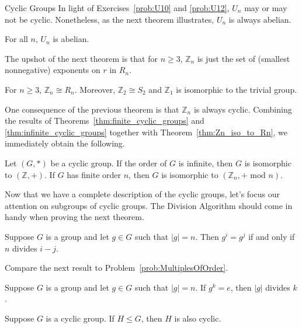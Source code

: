 \begin{section}{Cyclic Groups}
In light of Exercises~\ref{prob:U10} and \ref{prob:U12}, $U_n$ may or may not be cyclic. Nonetheless, as the next theorem illustrates, $U_n$ is always abelian.

\begin{theorem}
For all $n$, $U_n$ is abelian.
\end{theorem}

The upshot of the next theorem is that for $n\geq 3$, $\mathbb{Z}_n$ is just the set of (smallest nonnegative) exponents on $r$ in $R_n$.

\begin{theorem}\label{thm:Zn_iso_to_Rn}
For $n\geq 3$, $\mathbb{Z}_n\cong R_n$. Moreover, $\mathbb{Z}_2\cong S_2$ and $\mathbb{Z}_1$ is isomorphic to the trivial group.
\end{theorem}

One consequence of the previous theorem is that $\mathbb{Z}_n$ is always cyclic. Combining the results of Theorems~\ref{thm:finite_cyclic_groups} and \ref{thm:infinite_cyclic_groups} together with Theorem~\ref{thm:Zn_iso_to_Rn}, we immediately obtain the following.

\begin{theorem}
Let $(G,*)$ be a cyclic group. If the order of $G$ is infinite, then $G$ is isomorphic to $(\mathbb{Z},+)$. If $G$ has finite order $n$, then $G$ is isomorphic to $(\mathbb{Z}_n,+\text{ mod }n)$.
\end{theorem}

Now that we have a complete description of the cyclic groups, let's focus our attention on subgroups of cyclic groups.  The Division Algorithm should come in handy when proving the next theorem.

\begin{theorem}\label{thm:criterion_on_powers}
Suppose $G$ is a group and let $g\in G$ such that $|g|=n$.  Then $g^i=g^j$ if and only if $n$ divides $i-j$.
\end{theorem}

Compare the next result to Problem~\ref{prob:MultiplesOfOrder}.

\begin{corollary}
Suppose $G$ is a group and let $g\in G$ such that $|g|=n$.  If $g^k=e$, then $|g|$ divides $k$.
\end{corollary}

\begin{theorem}\label{thm:subgroups_of_cyclic_groups}
Suppose $G$ is a cyclic group. If $H\leq G$, then $H$ is also cyclic.
\end{theorem}


\end{section}
